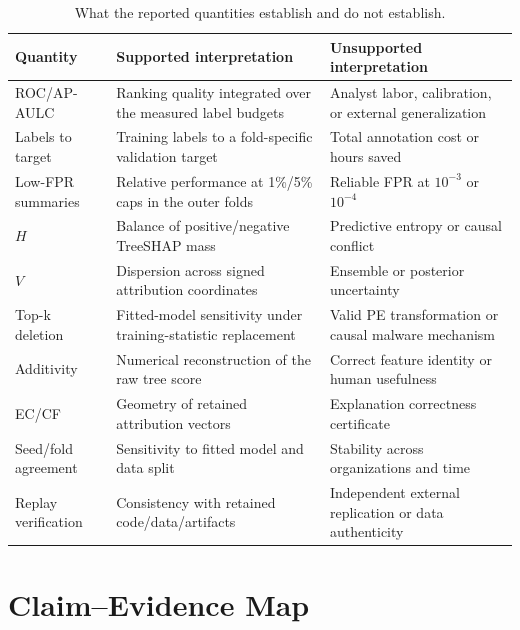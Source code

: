 \begin{table}[h]
\centering
\caption{What the reported quantities establish and do not establish.}
\label{tab:boundaries}
\scriptsize
\setlength{\tabcolsep}{3pt}
\begin{tabular}{p{2.4cm}p{5.8cm}p{6.5cm}}
\toprule
Quantity & Supported interpretation & Unsupported interpretation \\
\midrule
ROC/AP-AULC & Ranking quality integrated over the measured label budgets & Analyst labor, calibration, or external generalization \\
Labels to target & Training labels to a fold-specific validation target & Total annotation cost or hours saved \\
Low-FPR summaries & Relative performance at 1\%/5\% caps in the outer folds & Reliable FPR at $10^{-3}$ or $10^{-4}$ \\
$H$ & Balance of positive/negative TreeSHAP mass & Predictive entropy or causal conflict \\
$V$ & Dispersion across signed attribution coordinates & Ensemble or posterior uncertainty \\
Top-k deletion & Fitted-model sensitivity under training-statistic replacement & Valid PE transformation or causal malware mechanism \\
Additivity & Numerical reconstruction of the raw tree score & Correct feature identity or human usefulness \\
EC/CF & Geometry of retained attribution vectors & Explanation correctness certificate \\
Seed/fold agreement & Sensitivity to fitted model and data split & Stability across organizations and time \\
Replay verification & Consistency with retained code/data/artifacts & Independent external replication or data authenticity \\
\bottomrule
\end{tabular}
\end{table}

\section{Claim--Evidence Map}

